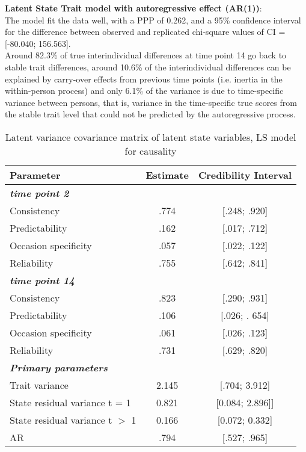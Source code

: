 \textbf{Latent State Trait model with autoregressive effect (AR(1))}: \\
The model fit the data well, with a PPP of 0.262, and a 95\% confidence interval for the difference between observed and replicated chi-square values of CI = [-80.040; 156.563]. \\
Around 82.3\% of true interindividual differences at time point 14 go back to stable trait differences, around 10.6\% of the interindividual differences can be explained by carry-over effects from previous time points (i.e. inertia in the within-person process) and only 6.1\% of the variance is due to time-specific variance between persons, that is, variance in the time-specific true scores from the stable trait level that could not be predicted by the autoregressive process.


\begin{table}[H]
 \setlength{\tabcolsep}{1mm}
 \begin{center}
        \caption[Correlation latent State causality]{Latent variance covariance matrix of latent state variables, LS model for causality}
        \label{Tab: correlations LS causality}
            {\footnotesize
            \begin{tabular}{lcc}
            \hline 
          Parameter & Estimate & Credibility Interval\\
         \hline 
         \textbf{\textit{time point 2}} & & \\
           Consistency & .774& [.248; .920] \\
           Predictability& .162& [.017; .712]\\
           Occasion specificity & .057&[.022; .122] \\
           Reliability &.755& [.642; .841] \\
             \textbf{\textit{time point 14}} & & \\
           Consistency & .823 &[.290; .931] \\
           Predictability& .106&[.026; . 654] \\
           Occasion specificity & .061&[.026; .123] \\
           Reliability &.731& [.629; .820] \\
            \textbf{\textit{Primary parameters}} & & \\
            Trait variance &2.145 & [.704; 3.912] \\
             State residual variance t = 1 & 0.821 & [0.084; 2.896]] \\
             State residual variance  t $>$ 1 & 0.166& [0.072; 0.332] \\
              AR  & .794 & [.527; .965] \\


\end{tabular}}
\end{center}
\end{table}
